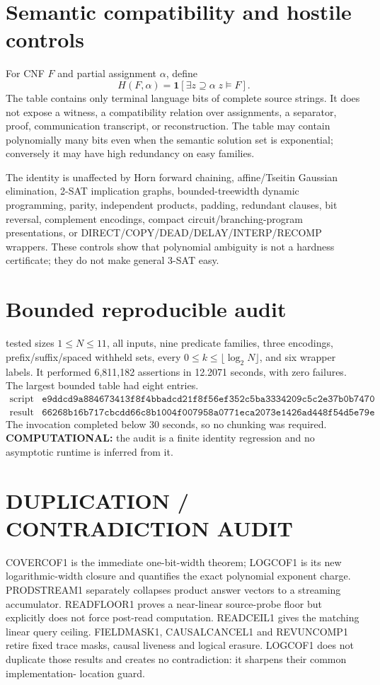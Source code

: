 \documentclass[11pt]{article}
\newcommand{\Status}[1]{\textbf{#1}}
\begin{document}
\section{Semantic compatibility and hostile controls}
For CNF \(F\) and partial assignment \(\alpha\), define
\[
 H(F,\alpha)=\mathbf 1[\exists z\supseteq\alpha\;z\models F].
\]
The table contains only terminal language bits of complete source strings. It
does not expose a witness, a compatibility relation over assignments, a
separator, proof, communication transcript, or reconstruction. The table may
contain polynomially many bits even when the semantic solution set is
exponential; conversely it may have high redundancy on easy families.

The identity is unaffected by Horn forward chaining, affine/Tseitin Gaussian
elimination, 2-SAT implication graphs, bounded-treewidth dynamic programming,
parity, independent products, padding, redundant clauses, bit reversal,
complement encodings, compact circuit/branching-program presentations, or
DIRECT/COPY/DEAD/DELAY/INTERP/RECOMP wrappers. These controls show that
polynomial ambiguity is not a hardness certificate; they do not make general
3-SAT easy.

\section{Bounded reproducible audit}
 tested sizes
\(1\le N\le11\), all inputs, nine predicate families, three encodings,
prefix/suffix/spaced withheld sets, every \(0\le k\le\lfloor\log_2N\rfloor\),
and six wrapper labels. It performed 6,811,182 assertions in 12.2071 seconds,
with zero failures. The largest bounded table had eight entries.
\[
\begin{array}{ll}
\text{script SHA-256}&
\texttt{e9ddcd9a884673413f8f4bbadcd21f8f56ef352c5ba3334209c5c2e37b0b7470}\\
\text{result SHA-256}&
\texttt{66268b16b717cbcdd66c8b1004f007958a0771eca2073e1426ad448f54d5e79e}
\end{array}
\]
The invocation completed below 30 seconds, so no chunking was required.
\Status{COMPUTATIONAL:} the audit is a finite identity regression and no
asymptotic runtime is inferred from it.

\section{DUPLICATION / CONTRADICTION AUDIT}
COVERCOF1 is the immediate one-bit-width theorem; LOGCOF1 is its new
logarithmic-width closure and quantifies the exact polynomial exponent charge.
PRODSTREAM1 separately collapses product answer vectors to a streaming
accumulator. READFLOOR1 proves a near-linear source-probe floor but explicitly
does not force post-read computation. READCEIL1 gives the matching linear
query ceiling. FIELDMASK1, CAUSALCANCEL1 and REVUNCOMP1 retire fixed trace
masks, causal liveness and logical erasure. LOGCOF1 does not duplicate those
results and creates no contradiction: it sharpens their common implementation-
location guard.
\end{document}
